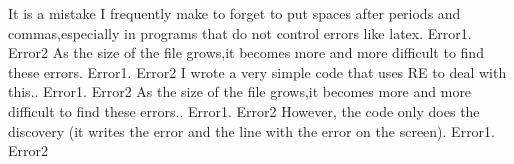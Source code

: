 It is a mistake I frequently make to forget to put spaces after periods and commas,especially in programs that do not control errors like latex. Error1. Error2
As the size of the file grows,it becomes more and more difficult to find these errors. Error1. Error2
I wrote a very simple code that uses RE to deal with this.. Error1. Error2
As the size of the file grows,it becomes more and more difficult to find these errors.. Error1. Error2
However, the code only does the discovery (it writes the error and the line with the error on the screen). Error1. Error2